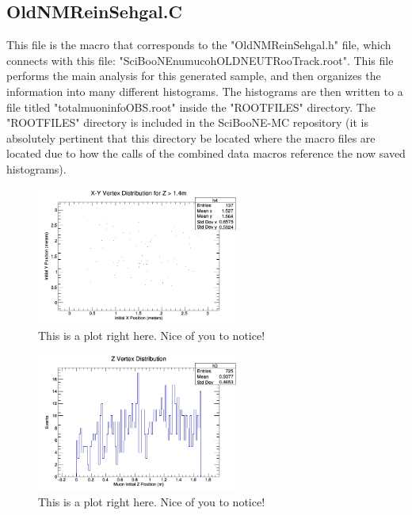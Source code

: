 \documentclass[11pt]{article}
\begin{document}
\subsection{OldNMReinSehgal.C}
This file is the macro that corresponds to the "OldNMReinSehgal.h" file, which connects with this file: "SciBooNE\textunderscore numu\textunderscore coh\textunderscore OLDNEUT\textunderscore RooTrack.root". This file performs the main analysis for this generated sample, and then organizes the information into many different histograms. The histograms are then written to a file titled "totalmuoninfoOBS.root" inside the "ROOTFILES" directory. The "ROOTFILES" directory is included in the SciBooNE-MC repository (it is absolutely pertinent that this directory be located where the macro files are located due to how the calls of the combined data macros reference the now saved histograms).

\begin{figure}[H]
\centering
\includegraphics[width=0.6\textwidth]{OldNMReinSehgalImages/1-X-YVertexDistributionNMORS.png}
\caption{This is a plot right here. Nice of you to notice!}
\end{figure}

\begin{figure}[H]
\centering
\includegraphics[width=0.6\textwidth]{OldNMReinSehgalImages/2-ZVertexDistributionNMORS.png}
\caption{This is a plot right here. Nice of you to notice!}
\end{figure}
\end{document}
